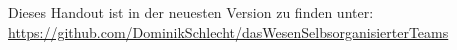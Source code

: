 \documentclass[a4paper,11pt,DIV=11,oneside]{scrartcl} %
\begin{document}
	\setcounter{page}{1}	%
	
	\tableofcontents %


	
	\vspace{\fill}
	Dieses Handout ist in der neuesten Version zu finden unter:\\
	\url{https://github.com/DominikSchlecht/dasWesenSelbsorganisierterTeams}
	\printbibliography %
\end{document}

